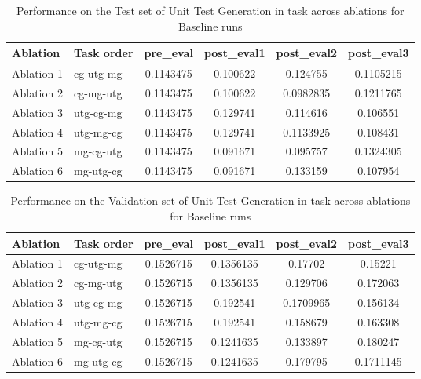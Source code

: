 \begin{table}[!ht]
    \centering
    \caption{Performance on the Test set of Unit Test Generation in task across ablations for Baseline runs}
    \begin{tabular}{|l|l|S[table-format=2.4]|S[table-format=2.4]|S[table-format=2.4]|S[table-format=2.4]|}
    \hline
        \textbf{Ablation} & \textbf{Task order} & \textbf{pre\_eval} & \textbf{post\_eval1} & \textbf{post\_eval2} & \textbf{post\_eval3 } \\ \hline
        Ablation 1 & cg-utg-mg & 0.1143475 & 0.100622 & 0.124755 & 0.1105215  \\ 
        Ablation 2 & cg-mg-utg & 0.1143475 & 0.100622 & 0.0982835 & 0.1211765  \\ 
        Ablation 3 & utg-cg-mg & 0.1143475 & 0.129741 & 0.114616 & 0.106551  \\ 
        Ablation 4 & utg-mg-cg & 0.1143475 & 0.129741 & 0.1133925 & 0.108431  \\ 
        Ablation 5 & mg-cg-utg & 0.1143475 & 0.091671 & 0.095757 & 0.1324305  \\ 
        Ablation 6 & mg-utg-cg & 0.1143475 & 0.091671 & 0.133159 & 0.107954 \\ \hline
    \end{tabular}
    \label{tab:UnitTestGenTestBaseline}
\end{table}

\begin{table}[!ht]
    \centering
    \caption{Performance on the Validation set of Unit Test Generation in task across ablations for Baseline runs}
    \begin{tabular}{|l|l|S[table-format=2.4]|S[table-format=2.4]|S[table-format=2.4]|S[table-format=2.4]|}
    \hline
        \textbf{Ablation} & \textbf{Task order} & \textbf{pre\_eval} & \textbf{post\_eval1} & \textbf{post\_eval2} & \textbf{post\_eval3 } \\ \hline
        Ablation 1 & cg-utg-mg & 0.1526715 & 0.1356135 & 0.17702 & 0.15221  \\ 
        Ablation 2 & cg-mg-utg & 0.1526715 & 0.1356135 & 0.129706 & 0.172063  \\ 
        Ablation 3 & utg-cg-mg & 0.1526715 & 0.192541 & 0.1709965 & 0.156134  \\ 
        Ablation 4 & utg-mg-cg & 0.1526715 & 0.192541 & 0.158679 & 0.163308  \\ 
        Ablation 5 & mg-cg-utg & 0.1526715 & 0.1241635 & 0.133897 & 0.180247  \\ 
        Ablation 6 & mg-utg-cg & 0.1526715 & 0.1241635 & 0.179795 & 0.1711145 \\ \hline
    \end{tabular}
    \label{tab:UnitTestGenValBaseline}
\end{table}

